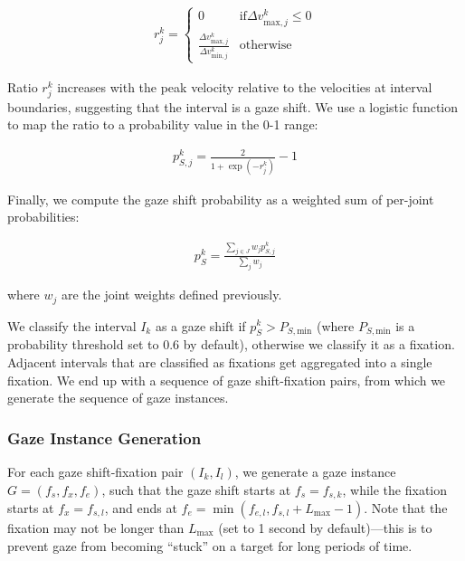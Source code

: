 \begin{align} \label{eq:GazeShiftRatio}
r_j^k =
\begin{cases}
0 & \text{if} \Delta v_{\mathrm{max},j}^k \leq 0 \\
\frac{\Delta v_{\mathrm{max},j}^k}{\Delta v_{\mathrm{min},j}^k} & \text{otherwise}
\end{cases}
\end{align}

Ratio $r_j^k$ increases with the peak velocity relative to the velocities at interval boundaries, suggesting that the interval is a gaze shift. We use a logistic function to map the ratio to a probability value in the 0-1 range:

\begin{align} \label{eq:GazeShiftProbability}
p_{S,j}^k = \frac{2}{1 + \mathop{exp}(-r_j^k)} - 1
\end{align}

Finally, we compute the gaze shift probability as a weighted sum of per-joint probabilities:

\begin{align} \label{eq:GazeShiftGlobalProbability}
p_S^k = \frac{\sum_{j \in J} w_j p_{S,j}^k}{\sum_j w_j}
\end{align}

where $w_j$ are the joint weights defined previously.

We classify the interval $I_k$ as a gaze shift if $p_S^k > P_{S,\mathrm{min}}$ (where $P_{S,\mathrm{min}}$ is a probability threshold set to 0.6 by default), otherwise we classify it as a fixation. Adjacent intervals that are classified as fixations get aggregated into a single fixation. We end up with a sequence of gaze shift-fixation pairs, from which we generate the sequence of gaze instances.

\subsubsection{Gaze Instance Generation}

For each gaze shift-fixation pair $(I_k, I_l)$, we generate a gaze instance $G = (f_s, f_x, f_e)$, such that the gaze shift starts at $f_s = f_{s,k}$, while the fixation starts at $f_x = f_{s,l}$, and ends at $f_e = \mathop{min}(f_{e,l}, f_{s,l} + L_\mathrm{max} - 1)$. Note that the fixation may not be longer than $L_\mathrm{max}$ (set to 1 second by default)---this is to prevent gaze from becoming ``stuck'' on a target for long periods of time.

